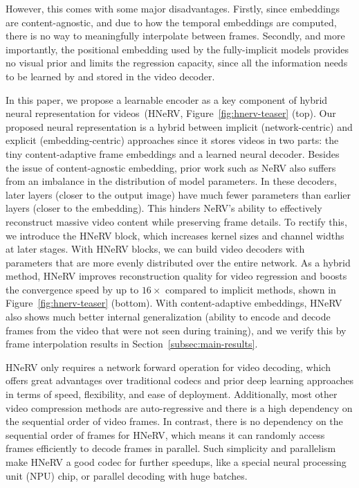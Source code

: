 \documentclass[10pt,twocolumn,letterpaper]{article}
\begin{document}
However, this comes with some major disadvantages.
Firstly, since embeddings are content-agnostic, and due to how the temporal embeddings are computed, there is no way to meaningfully interpolate between frames.
Secondly, and more importantly, the positional embedding used by the fully-implicit models provides no visual prior and limits the regression capacity, since all the information needs to be learned by and stored in the video decoder.


In this paper, we propose a learnable encoder as a key component of hybrid neural representation for videos~(HNeRV, Figure~\ref{fig:hnerv-teaser} (top).
Our proposed neural representation is a hybrid between implicit (network-centric) and explicit (embedding-centric) approaches since it stores videos in two parts: the tiny content-adaptive frame embeddings and a learned neural decoder.
Besides the issue of content-agnostic embedding, prior work such as NeRV also suffers from an imbalance in the distribution of model parameters. 
In these decoders, later layers (closer to the output image) have much fewer parameters than earlier layers (closer to the embedding).
This hinders NeRV's ability to effectively reconstruct massive video content while preserving frame details.
To rectify this, we introduce the HNeRV block, which increases kernel sizes and channel widths at later stages.
With HNeRV blocks, we can build video decoders with parameters that are more evenly distributed over the entire network.
As a hybrid method, HNeRV improves reconstruction quality for video regression and boosts the convergence speed by up to $16\times$ compared to implicit methods, shown in Figure~\ref{fig:hnerv-teaser} (bottom).
With content-adaptive embeddings, HNeRV also shows much better internal generalization (ability to encode and decode frames from the video that were not seen during training), and we verify this by frame interpolation results in Section~\ref{subsec:main-results}.


HNeRV only requires a network forward operation for video decoding, which offers great advantages over traditional codecs and prior deep learning approaches in terms of speed, flexibility, and ease of deployment.
Additionally, most other video compression methods are auto-regressive and there is a high dependency on the sequential order of video frames.
In contrast, there is no dependency on the sequential order of frames for HNeRV, which means it can randomly access frames efficiently to decode frames in parallel.
Such simplicity and parallelism make HNeRV a good codec for further speedups, like a special neural processing unit (NPU) chip, or parallel decoding with huge batches.
\end{document}
